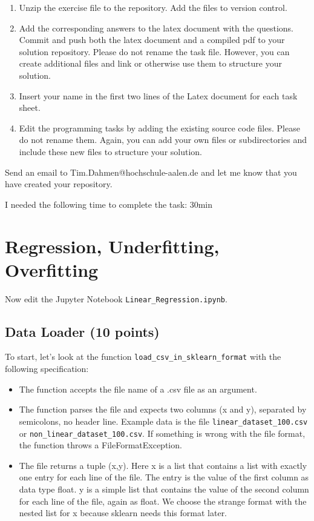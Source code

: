 \begin{enumerate}
\item Unzip the exercise file to the repository. Add the files to version control.  
\item Add the corresponding answers to the latex document with the questions. Commit and push both the latex document and a compiled pdf to your solution repository. Please do not rename the task file. However, you can create additional files and link or otherwise use them to structure your solution. 
\item Insert your name in the first two lines of the Latex document for each task sheet.
\item Edit the programming tasks by adding the existing source code files. Please do not rename them. Again, you can add your own files or subdirectories and include these new files to structure your solution. 
\end{enumerate}

Send an email to Tim.Dahmen@hochschule-aalen.de and let me know that you have created your repository. 

I needed the following time to complete the task: 30min

\section{Regression, Underfitting, Overfitting}

Now edit the Jupyter Notebook \texttt{Linear\_Regression.ipynb}.

\subsection{Data Loader (10 points)}

To start, let's look at the function \texttt{load\_csv\_in\_sklearn\_format} with the following specification:

\begin{itemize}
\item The function accepts the file name of a .csv file as an argument.
\item The function parses the file and expects two columns (x and y), separated by semicolons, no header line. Example data is the file \texttt{linear\_dataset\_100.csv} or \texttt{non\_linear\_dataset\_100.csv}. If something is wrong with the file format, the function throws a FileFormatException.
\item The file returns a tuple (x,y). Here x is a list that contains a list with exactly one entry for each line of the file. The entry is the value of the first column as data type float. y is a simple list that contains the value of the second column for each line of the file, again as float. We choose the strange format with the nested list for x because sklearn needs this format later.
\end{itemize}

